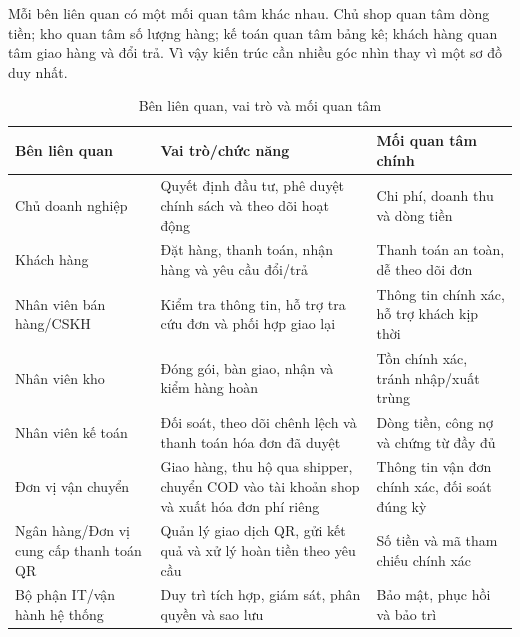 \documentclass[12pt,a4paper]{report}
\begin{document}
Mỗi bên liên quan có một mối quan tâm khác nhau. Chủ shop quan tâm dòng tiền; kho quan tâm số lượng hàng; kế toán quan tâm bảng kê; khách hàng quan tâm giao hàng và đổi trả. Vì vậy kiến trúc cần nhiều góc nhìn thay vì một sơ đồ duy nhất.

\begin{table}[H]
\centering
\caption{Bên liên quan, vai trò và mối quan tâm}
\begin{tabularx}{\textwidth}{p{}YY}
\toprule
\textbf{Bên liên quan} & \textbf{Vai trò/chức năng} & \textbf{Mối quan tâm chính}\\
\midrule
Chủ doanh nghiệp & Quyết định đầu tư, phê duyệt chính sách và theo dõi hoạt động & Chi phí, doanh thu và dòng tiền\\
Khách hàng & Đặt hàng, thanh toán, nhận hàng và yêu cầu đổi/trả & Thanh toán an toàn, dễ theo dõi đơn\\
Nhân viên bán hàng/CSKH & Kiểm tra thông tin, hỗ trợ tra cứu đơn và phối hợp giao lại & Thông tin chính xác, hỗ trợ khách kịp thời\\
Nhân viên kho & Đóng gói, bàn giao, nhận và kiểm hàng hoàn & Tồn chính xác, tránh nhập/xuất trùng\\
Nhân viên kế toán & Đối soát, theo dõi chênh lệch và thanh toán hóa đơn đã duyệt & Dòng tiền, công nợ và chứng từ đầy đủ\\
Đơn vị vận chuyển & Giao hàng, thu hộ qua shipper, chuyển COD vào tài khoản shop và xuất hóa đơn phí riêng & Thông tin vận đơn chính xác, đối soát đúng kỳ\\
Ngân hàng/Đơn vị cung cấp thanh toán QR & Quản lý giao dịch QR, gửi kết quả và xử lý hoàn tiền theo yêu cầu & Số tiền và mã tham chiếu chính xác\\
Bộ phận IT/vận hành hệ thống & Duy trì tích hợp, giám sát, phân quyền và sao lưu & Bảo mật, phục hồi và bảo trì\\
\bottomrule
\end{tabularx}
\end{table}
\end{document}
